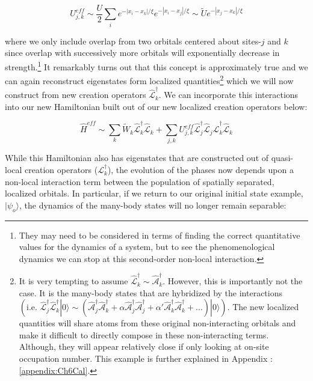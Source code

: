 \begin{equation}
U^{eff}_{j,k} \sim \frac{U}{2} \sum_i e^{-| x_i - x_k |/\xi } e^{-| x_i - x_j |/\xi } \sim \tilde{U} e^{-| x_j - x_k |/ \xi}
\label{eqn:ueff}
\end{equation}

where we only include overlap from two orbitals centered about sites-$j$ and $k$ since overlap with successively more orbitals will exponentially decrease in strength.\footnote{They may need to be considered in terms of finding the correct quantitative values for the dynamics of a system, but to see the phenomenological dynamics we can stop at this second-order non-local interaction.} It remarkably turns out that this concept is approximately true and we can again reconstruct eigenstates form localized quantities\cite{Serbyn2013a,Serbyn2013b,Huse2014}\footnote{It is very tempting to assume $\hat{\mathcal{L}}^\dagger_k \sim \hat{\mathcal{A}}^\dagger_k$. However, this is importantly not the case. It is the many-body states that are hybridized by the interactions $ \left (\text{i.e.~} \hat{\mathcal{L}}^\dagger_j \hat{\mathcal{L}}^\dagger_k |0\rangle \sim \left ( \hat{\mathcal{A}}^\dagger_j \hat{\mathcal{A}}^\dagger_k  + \alpha \hat{\mathcal{A}}^\dagger_j \hat{\mathcal{A}}^\dagger_j + \alpha' \hat{\mathcal{A}}^\dagger_k \hat{\mathcal{A}}^\dagger_k + ...   \right ) |0\rangle \right )$. The new localized quantities will share atoms from these original non-interacting orbitals and make it difficult to directly compose in these non-interacting terms. Although, they will appear relatively close if only looking at on-site occupation number. This example is further explained in Appendix : \ref{appendix:Ch6Cal}.} which we will now construct from new creation operators $\hat{\mathcal{L}}^\dagger_k$.  We can incorporate this interactions into our new Hamiltonian built out of our new localized creation operators below:

\begin{equation}
\hat{H}^{eff} \sim \sum_k \tilde{W}_k \hat{\mathcal{L}}_k^\dagger \hat{\mathcal{L}}_k + \sum_{j,k} U^{eff}_{j,k} \hat{\mathcal{L}}_j^\dagger \hat{\mathcal{L}}_j\hat{\mathcal{L}}_k^\dagger \hat{\mathcal{L}}_k
\label{eqn:hamMBL}
\end{equation}

While this Hamiltonian also has eigenstates that are constructed out of quasi-local creation operators ($\mathcal{L}^\dagger_k$), the evolution of the phases now depends upon a non-local interaction term between the population of spatially separated, localized orbitals. In particular, if we return to our original initial state example, $|\psi_o\rangle$, the dynamics of the many-body states will no longer remain separable:

